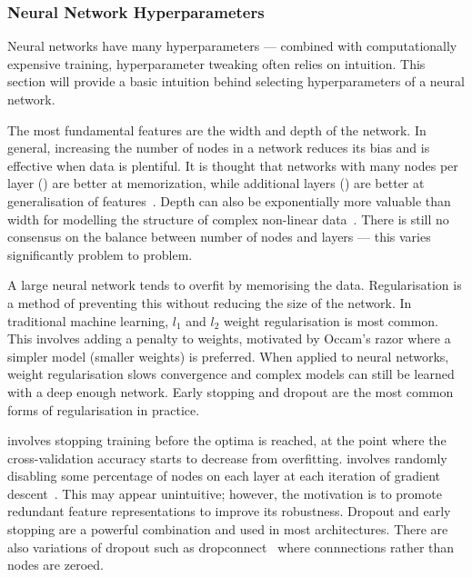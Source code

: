 \documentclass[12pt, twoside]{book}
\renewcommand\emph[1]{\textit{\color{USred}{#1}}}
\begin{document}
\subsubsection{Neural Network Hyperparameters}
Neural networks have many hyperparameters --- combined with computationally expensive training, hyperparameter tweaking often relies on intuition. This section will provide a basic intuition behind selecting hyperparameters of a neural network. 

The most fundamental features are the width and depth of the network. In general, increasing the number of nodes in a network reduces its bias and is effective when data is plentiful. It is thought that networks with many nodes per layer (\emph{width}) are better at memorization, while additional layers (\emph{depth}) are better at generalisation of features~\cite{cheng2016wide}. Depth can also be exponentially more valuable than width for modelling the structure of complex non-linear data~\cite{eldan2016power}. There is still no consensus on the balance between number of nodes and layers --- this varies significantly problem to problem.

A large neural network tends to overfit by memorising the data. Regularisation is a method of preventing this without reducing the size of the network. In traditional machine learning, $l_1$ and $l_2$ weight regularisation is most common. This involves adding a penalty to weights, motivated by Occam's razor where a simpler model (smaller weights) is preferred. When applied to neural networks, weight regularisation slows convergence and complex models can still be learned with a deep enough network. {Early stopping} and {dropout} are the most common forms of regularisation in practice.
\newpage 

\emph{Early stopping} involves stopping training before the optima is reached, at the point where the cross-validation accuracy starts to decrease from overfitting. \emph{Dropout} involves randomly disabling some percentage of nodes on each layer at each iteration of gradient descent~\cite{dropout}. This may appear unintuitive; however, the motivation is to promote redundant feature representations to improve its robustness. Dropout and early stopping are a powerful combination and used in most architectures. There are also variations of dropout such as dropconnect~\cite{dropconnect} where connnections rather than nodes are zeroed.
\end{document}

